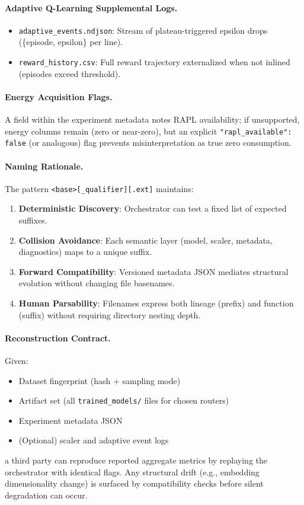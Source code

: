 \paragraph{Adaptive Q-Learning Supplemental Logs.}
\begin{itemize}
  \item \texttt{adaptive\_events.ndjson}: Stream of plateau-triggered epsilon drops (\{episode, epsilon\} per line).
  \item \texttt{reward\_history.csv}: Full reward trajectory externalized when not inlined (episodes exceed threshold).
\end{itemize}

\paragraph{Energy Acquisition Flags.}
A field within the experiment metadata notes RAPL availability; if unsupported, energy columns remain (zero or near-zero), but an explicit \texttt{"rapl\_available": false} (or analogous) flag prevents misinterpretation as true zero consumption.

\paragraph{Naming Rationale.}
The pattern \texttt{<base>[\_qualifier][.ext]} maintains:
\begin{enumerate}
  \item \textbf{Deterministic Discovery}: Orchestrator can test a fixed list of expected suffixes.
  \item \textbf{Collision Avoidance}: Each semantic layer (model, scaler, metadata, diagnostics) maps to a unique suffix.
  \item \textbf{Forward Compatibility}: Versioned metadata JSON mediates structural evolution without changing file basenames.
  \item \textbf{Human Parsability}: Filenames express both lineage (prefix) and function (suffix) without requiring directory nesting depth.
\end{enumerate}

\paragraph{Reconstruction Contract.}
Given:
\begin{itemize}
  \item Dataset fingerprint (hash + sampling mode)
  \item Artifact set (all \texttt{trained\_models/} files for chosen routers)
  \item Experiment metadata JSON
  \item (Optional) scaler and adaptive event logs
\end{itemize}
\noindent a third party can reproduce reported aggregate metrics by replaying the orchestrator with identical flags. Any structural drift (e.g., embedding dimensionality change) is surfaced by compatibility checks before silent degradation can occur.

